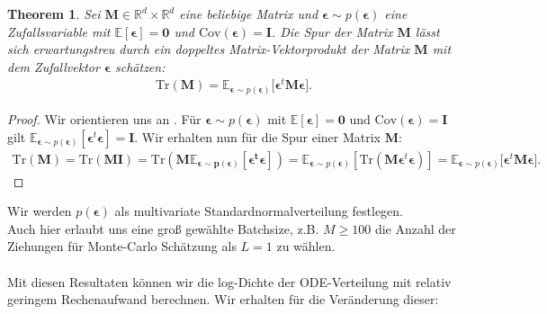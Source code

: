 \documentclass[12pt]{article}
\newcommand{\E}{\mathbb{E}}
\newtheorem{theorem}{Theorem}
\begin{document}
	\begin{theorem}%
	Sei $\mathbf{M}\in \mathbb{R}^d \times \mathbb{R}^d$ eine beliebige Matrix und $\boldsymbol\epsilon \sim p(\boldsymbol\epsilon)$ eine Zufallsvariable mit $\E[\boldsymbol\epsilon] = \mathbf{0}$ und $\mathrm{Cov}(\boldsymbol\epsilon) =\mathbf{I}$. Die Spur der Matrix $\mathbf{M}$ lässt sich erwartungstreu durch ein doppeltes Matrix-Vektorprodukt der Matrix  $\mathbf{M}$ mit dem Zufallvektor $\boldsymbol\epsilon$ schätzen:
	\begin{align*}
	\mathrm{Tr}(\mathbf{M}) =
	\E_{\boldsymbol\epsilon \sim p(\boldsymbol\epsilon)}\big[\boldsymbol\epsilon^t \mathbf{M} \boldsymbol\epsilon \big].
	\end{align*}
	\end{theorem}
	\begin{proof} Wir orientieren uns an \cite{Hutchin}.
	Für $\boldsymbol\epsilon \sim p(\boldsymbol\epsilon)$ mit $\E[\boldsymbol\epsilon] = \mathbf{0}$ und $\mathrm{Cov}(\boldsymbol\epsilon) =\mathbf{I}$ gilt $\E_{\boldsymbol\epsilon\sim p(\boldsymbol\epsilon)}[\boldsymbol\epsilon^t\boldsymbol\epsilon] = \mathbf{I}.$ Wir erhalten nun für die Spur einer Matrix $\mathbf{M}$:
	 \begin{align*}
	 \mathrm{Tr}(\mathbf{M}) = \mathrm{Tr}(\mathbf{MI}) = \mathrm{Tr}(\mathbf{M\E_{\boldsymbol\epsilon\sim p(\boldsymbol\epsilon)}[\boldsymbol\epsilon^t\boldsymbol\epsilon]}) = \E_{\boldsymbol\epsilon\sim p(\boldsymbol\epsilon)}[\mathrm{Tr}(\mathbf{M}\boldsymbol\epsilon^t\boldsymbol\epsilon)] =
	 \E_{\boldsymbol\epsilon \sim p(\boldsymbol\epsilon)}\big[\boldsymbol\epsilon^t \mathbf{M} \boldsymbol\epsilon \big].
	 \end{align*}
	 \end{proof}
	Wir werden $p(\boldsymbol\epsilon)$ als multivariate Standardnormalverteilung festlegen.\\
	Auch hier erlaubt uns eine groß gewählte Batchsize, z.B. $M\ge100$ die Anzahl der Ziehungen für Monte-Carlo Schätzung als $L=1$ zu wählen.\\
	\\
	Mit diesen Resultaten können wir die log-Dichte der ODE-Verteilung mit relativ geringem Rechenaufwand berechnen.
	Wir erhalten für die Veränderung dieser:
\end{document}
